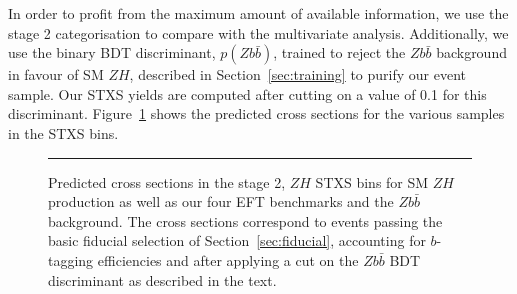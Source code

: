 %
In order to profit from the maximum amount of available information, we use the stage 2 categorisation to compare with the multivariate analysis. Additionally, we use the binary BDT discriminant, $p(Z b\bar{b})$, trained to reject the $Zb\bar{b}$ background in favour of SM $ZH$, described in Section~\ref{sec:training} to purify our event sample. Our STXS yields are computed after cutting on a value of 0.1 for this discriminant. Figure~\ref{fig:stxs} shows the predicted cross sections for the various samples in the STXS bins.

\begin{figure}[h!]
\rule{3cm}{3cm}    \caption{\label{fig:stxs}
    Predicted cross sections in the stage 2, $ZH$ STXS bins for SM $ZH$ production as well as our four EFT benchmarks and the $Zb\bar{b}$ background. The cross sections correspond to events passing the basic fiducial selection of Section~\ref{sec:fiducial}, accounting for $b$-tagging efficiencies and after applying a cut on the $Zb\bar{b}$ BDT discriminant as described in the text.
    }
\end{figure}




